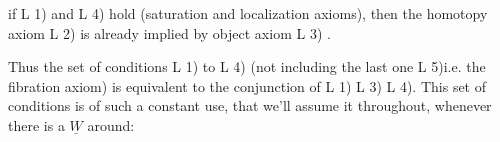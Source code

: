 if L 1) and L 4) hold (saturation and localization axioms), then
the homotopy axiom L 2) is already implied by  object
axiom L 3) .

Thus the set of conditions L 1) to L 4) (not including the last
one L 5)i.e. the fibration axiom) is equivalent to the conjunction
of L 1) L 3) L 4). This set of conditions is of such a constant use,
that we'll assume it throughout, whenever there is a $\underline{W}$ around:

